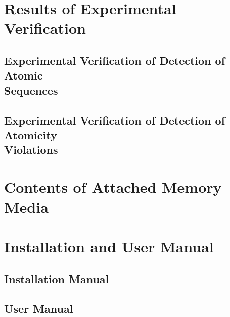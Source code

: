 

\chapter{Results of Experimental Verification}
\label{chap:expRes}



\section[%
    Experimental Verification of Detection of Atomic Sequences
]{\texorpdfstring{%
    Experimental Verification of Detection of Atomic \\ Sequences
}{}}
\label{sec:expResPhase1}



\section[%
    Experimental Verification of Detection of Atomicity Violations
]{\texorpdfstring{%
    Experimental Verification of Detection of Atomicity \\ Violations
}{}}
\label{sec:expResPhase2}




\chapter{Contents of Attached Memory Media}
\label{chap:memMedia}




\chapter{Installation and User Manual}
\label{chap:man}



\section{Installation Manual}
\label{sec:installMan}



\section{User Manual}
\label{sec:userMan}



